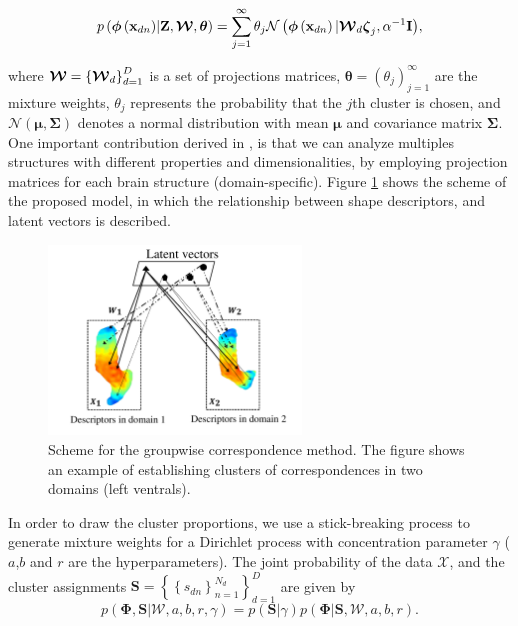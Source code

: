 	\begin{equation}
	p\left( {{\boldsymbol{\phi}\left(\mathbf{x}_{dn}\right)}|{\boldsymbol{\mathrm{Z}}},{\boldsymbol{\mathcal{W}}},{\boldsymbol{\theta }}} \right) = \sum\limits_{j = 1}^\infty  {{\theta _j}\mathcal{N}\left(\boldsymbol{\phi}\left(\mathbf{x}_{dn}\right)|\boldsymbol{\mathcal{W}}_d\boldsymbol{\zeta}_j,\alpha^{-1}\mathbf{I}\right)}, 
	\label{eq:llNLmodel}
	\end{equation}
	
	where $\boldsymbol{\mathcal{W}} = \left\{\boldsymbol{\mathcal{W}}_d\right\}_{d=1}^{D}$ is a set of projections
	matrices, $\boldsymbol{\theta}=\left(\theta_j\right)_{j=1}^{\infty}$
	are the mixture weights, $\theta_j$ represents the probability that
	the $j$th cluster is chosen, and
	$\mathcal{N}\left(\boldsymbol{\mu},\boldsymbol{\Sigma}\right)$ denotes
	a normal distribution with mean $\boldsymbol{\mu}$ and covariance
	matrix $\boldsymbol{\Sigma}$. One important contribution derived in \cite{Iwata13}, is that we can analyze multiples structures with different properties and dimensionalities, by employing projection matrices for each brain structure (domain-specific). Figure
	\ref{fig:pipeline} shows the scheme of the proposed model, in which
	the relationship between shape descriptors, and
	latent vectors is described.
	
	\begin{figure}[h!]
		\centering
		\includegraphics[width=0.6\textwidth]{img/pipelineGroupCorr}
		\caption{Scheme for the groupwise correspondence method. The
			figure shows an example of establishing clusters of correspondences
			in two domains (left ventrals).}
		\label{fig:pipeline}
	\end{figure} 
	
	In order to draw the cluster proportions, we use a stick-breaking process to generate mixture weights for a Dirichlet process with
	concentration parameter $\gamma$ \cite{Iwata13} ($a$,$b$ and $r$ are the hyperparameters). The joint probability
	of the data $\mathcal{X}$, and the cluster assignments
	$\mathbf{S}=\left\{\left\{s_{dn}\right\}_{n=1}^{N_{d}}\right\}_{d=1}^{D}$
	are given by
	\begin{equation}
	p\left(\boldsymbol{\Phi},\mathbf{S}|\boldsymbol{\mathcal{W}},a,b,r,\gamma\right)=
	p\left(\mathbf{S}|\gamma\right)p\left(\boldsymbol{\Phi}|\mathbf{S},\boldsymbol{\mathcal{W}},a,b,r\right).
	\label{eq:jointP}
	\end{equation}
	
